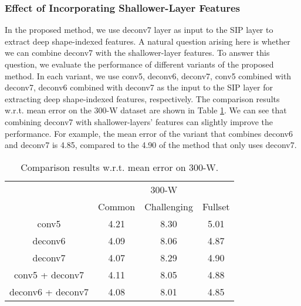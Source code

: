 \documentclass[journal]{IEEEtran}
\begin{document}
\subsubsection{Effect of Incorporating Shallower-Layer Features}
In the proposed method, we use deconv7 layer as input to the SIP layer to extract deep shape-indexed features. A natural question arising here is whether we can combine deconv7 with the shallower-layer features. To answer this question, we evaluate the performance of different variants of the proposed method. In each variant, we use conv5, deconv6, deconv7, conv5 combined with deconv7, deconv6 combined with deconv7 as the input to the SIP layer for extracting deep shape-indexed features, respectively. The comparison results w.r.t. mean error on the 300-W dataset are shown in Table \ref{feature_layer}. We can see that combining deconv7 with shallower-layers' features can slightly improve the performance. For example, the mean error of the variant that combines deconv6 and deconv7 is 4.85, compared to the 4.90 of the method that only uses deconv7.

\begin{table}[h]
\small
    \centering \caption{Comparison results w.r.t. mean error on 300-W.}
    \begin{tabular}{c|c c c}
      \hline
 & \multicolumn{3}{|c}{300-W}\\
    & Common & Challenging & Fullset \\
        \hline
        conv5 & 4.21  & 8.30  & 5.01  \\
         \hline
        deconv6 & 4.09  & 8.06 & 4.87 \\
         \hline
        deconv7 & 4.07 & 8.29 & 4.90  \\
         \hline
        conv5 + deconv7 & 4.11  & 8.05 & 4.88 \\
         \hline
        deconv6 + deconv7 & 4.08  & 8.01 & 4.85 \\
         \hline
        \end{tabular}
    \label{feature_layer}
\end{table}
\end{document}
